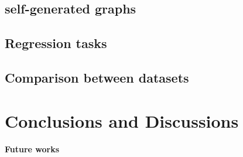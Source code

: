 \documentclass[sigconf]{acmart}
\begin{document}
\subsection{self-generated graphs}

\paragraph{}

\subsection{Regression tasks}







\subsection{Comparison between datasets}



\section{Conclusions and Discussions}




\paragraph{Future works}










\appendix
\end{document}
